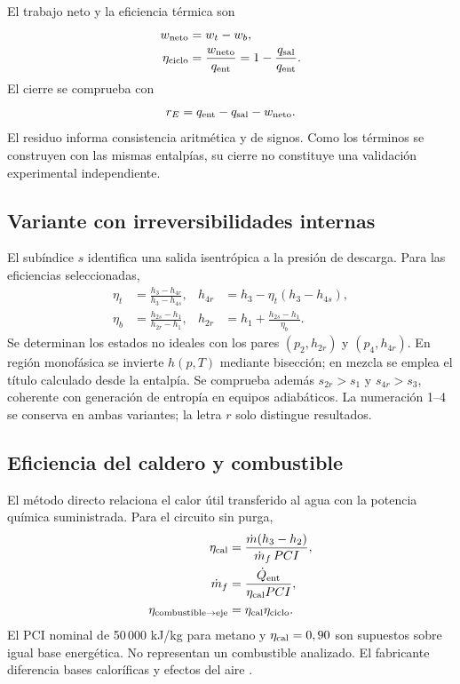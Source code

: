 \documentclass[conference,a4paper,11pt]{IEEEtran}
\begin{document}
El trabajo neto y la eficiencia térmica son
\begin{align}
w_{\rm neto}&=w_t-w_b,\label{eq:wn}\\
\eta_{\rm ciclo}&=\frac{w_{\rm neto}}{q_{\rm ent}}
=1-\frac{q_{\rm sal}}{q_{\rm ent}}.\label{eq:eta}
\end{align}
El cierre se comprueba con
\begin{equation}
r_E=q_{\rm ent}-q_{\rm sal}-w_{\rm neto}.
\label{eq:residuo}
\end{equation}
El residuo informa consistencia aritmética y de signos. Como los términos se construyen con las mismas entalpías, su cierre no constituye una validación experimental independiente.

\subsection{Variante con irreversibilidades internas}
El subíndice $s$ identifica una salida isentrópica a la presión de descarga. Para las eficiencias seleccionadas,
\begin{align}
\eta_t&=\frac{h_3-h_{4r}}{h_3-h_{4s}},
&h_{4r}&=h_3-\eta_t(h_3-h_{4s}),\label{eq:etat}\\
\eta_b&=\frac{h_{2s}-h_1}{h_{2r}-h_1},
&h_{2r}&=h_1+\frac{h_{2s}-h_1}{\eta_b}.\label{eq:etab}
\end{align}
Se determinan los estados no ideales con los pares $(p_2,h_{2r})$ y $(p_4,h_{4r})$. En región monofásica se invierte $h(p,T)$ mediante bisección; en mezcla se emplea el título calculado desde la entalpía. Se comprueba además $s_{2r}>s_1$ y $s_{4r}>s_3$, coherente con generación de entropía en equipos adiabáticos. La numeración 1--4 se conserva en ambas variantes; la letra $r$ solo distingue resultados.

\subsection{Eficiencia del caldero y combustible}
El método directo relaciona el calor útil transferido al agua con la potencia química suministrada. Para el circuito sin purga,
\begin{align}
\eta_{\rm cal}&=\frac{\dot m(h_3-h_2)}{\dot m_f\,PCI},\label{eq:etacal}\\
\dot m_f&=\frac{\dot Q_{\rm ent}}{\eta_{\rm cal}PCI},\label{eq:fuel}\\
\eta_{\rm combustible\to eje}&=\eta_{\rm cal}\eta_{\rm ciclo}.\label{eq:global}
\end{align}
El PCI nominal de 50\,000 kJ/kg para metano y $\eta_{\rm cal}=0,90$ son supuestos sobre igual base energética. No representan un combustible analizado. El fabricante diferencia bases caloríficas y efectos del aire \cite{spirax_eficiencia}.
\end{document}
